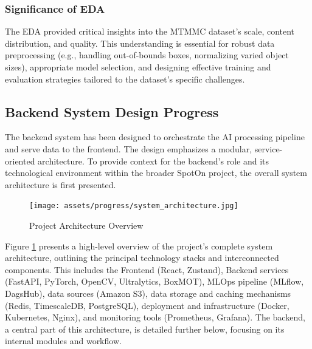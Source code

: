 \begin{itemize}
\subsubsection*{Significance of EDA}
The EDA provided critical insights into the MTMMC dataset's scale, content distribution, and quality. This understanding is essential for robust data preprocessing (e.g., handling out-of-bounds boxes, normalizing varied object sizes), appropriate model selection, and designing effective training and evaluation strategies tailored to the dataset's specific challenges.

\clearpage
\subsection*{Backend System Design Progress}
\label{subsec:progress_backend}
The backend system has been designed to orchestrate the AI processing pipeline and serve data to the frontend. The design emphasizes a modular, service-oriented architecture. To provide context for the backend's role and its technological environment within the broader SpotOn project, the overall system architecture is first presented.

\begin{figure}[!htb]
    \centering
    \texttt{[image: assets/progress/system\_architecture.jpg]}
    \caption{Project Architecture Overview}
    \label{fig:system_architecture}
\end{figure}
Figure \ref{fig:system_architecture} presents a high-level overview of the project's complete system architecture, outlining the principal technology stacks and interconnected components. This includes the Frontend (React, Zustand), Backend services (FastAPI, PyTorch, OpenCV, Ultralytics, BoxMOT), MLOps pipeline (MLflow, DagsHub), data sources (Amazon S3), data storage and caching mechanisms (Redis, TimescaleDB, PostgreSQL), deployment and infrastructure (Docker, Kubernetes, Nginx), and monitoring tools (Prometheus, Grafana). The backend, a central part of this architecture, is detailed further below, focusing on its internal modules and workflow.


\end{itemize}
